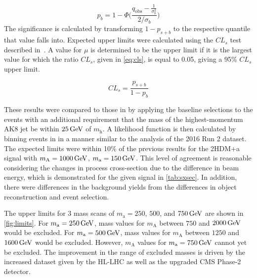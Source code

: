 \begin{equation}
    p_{b} =  1 - \Phi\bigg(\frac{q_\text{obs}-\frac{1}{\sigma^2_{b}}}{2/\sigma_{b}}\bigg)
    \label{eq:pb}
\end{equation}
The significance is calculated by transforming $1-p_{s+b}$ to the respective quantile that value falls into.
Expected upper limits were calculated using the $CL_s$ test described in~\cite{Junk_1999, Read_2002}. A value for $\mu$ is determined to be the upper limit if it is the largest value for which the ratio $CL_s$, given in \cref{eq:cls}, is equal to 0.05, giving a 95\% $CL_s$ upper limit. 

\begin{equation}
    CL_s = \frac{p_{s+b}}{1-p_{b}}
    \label{eq:cls}
\end{equation}

These results were compared to those in \cite{cms:hbb2019} by applying the baseline selections to the events with an additional requirement that the mass of the highest-momentum AK8 jet be within $\GeV{25}$ of $m_\mathrm{h}$. A likelihood function is then calculated by binning events in \ptmiss in a manner similar to the analysis of the 2016 Run 2 dataset. The expected limits were within 10\% of the previous results for the 2HDM+a signal with $m_\mathrm{A} = \GeV{1000}$, $m_\mathrm{a} = \GeV{150}$. This level of agreement is reasonable considering the changes in process cross-section due to the difference in beam energy, which is demonstrated for the given signal in \cref{tab:sxsec}. In addition, there were differences in the background yields from the differences in object reconstruction and event selection.



The upper limits for 3 mass scans of $m_\mathrm{a} = 250$, $500$, and $\GeV{750}$ are shown in \cref{fig:limits}. For $m_\mathrm{a} = \GeV{250}$, mass values for $m_\mathrm{A}$ between $750$ and $\GeV{2000}$ would be excluded. For $m_\mathrm{a} = \GeV{500}$, mass values for $m_\mathrm{A}$ between $1250$ and $\GeV{1600}$ would be excluded. However, $m_\mathrm{A}$ values for $m_\mathrm{a} = \GeV{750}$ cannot yet be excluded. The improvement in the range of excluded masses is driven by the increased dataset given by the HL-LHC as well as the upgraded CMS Phase-2 detector.

